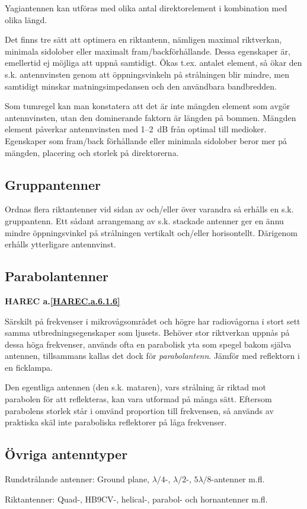 Yagiantennen kan utföras med olika antal direktorelement i kombination med
olika längd.

Det finns tre sätt att optimera en riktantenn, nämligen maximal
riktverkan, minimala sidolober eller maximalt fram/backförhållande.
Dessa egenskaper är, emellertid ej möjliga att uppnå samtidigt.
Ökas t.ex. antalet element, så ökar den s.k. antennvinsten genom att
öppningsvinkeln på strålningen blir mindre, men samtidigt minskar
matningsimpedansen och den användbara bandbredden.

Som tumregel kan man konstatera att det är inte mängden element som
avgör antennvinsten, utan den dominerande faktorn är längden på bommen.
Mängden element påverkar antennvinsten med 1--2~dB från optimal till
medioker.
Egenskaper som fram/back förhållande eller minimala sidolober beror mer
på mängden, placering och storlek på direktorerna.

\subsection{Gruppantenner}

Ordnas flera riktantenner vid sidan av och/eller över varandra så
erhålls en s.k. gruppantenn.
Ett sådant arrangemang av s.k. stackade antenner ger en ännu mindre
öppningsvinkel på strålningen vertikalt och/eller horisontellt.
Därigenom erhålls ytterligare antennvinst.

\subsection{Parabolantenner}
\textbf{
HAREC a.\ref{HAREC.a.6.1.6}\label{myHAREC.a.6.1.6}
}

Särskilt på frekvenser i mikrovågsområdet och högre har radiovågorna i
stort sett samma utbredningsegenskaper som ljusets.
Behöver stor riktverkan uppnås på dessa höga frekvenser, används ofta en
parabolisk yta som spegel bakom själva antennen, tillsammans kallas det dock
för \emph{parabolantenn}.
Jämför med reflektorn i en ficklampa.

Den egentliga antennen (den s.k. mataren), vars strålning är riktad
mot parabolen för att reflekteras, kan vara utformad på många sätt.
Eftersom parabolens storlek står i omvänd proportion till frekvensen, så
används av praktiska skäl inte paraboliska reflektorer på låga frekvenser.

\subsection{Övriga antenntyper}

Rundstrålande antenner: Ground plane, \(\lambda/4\)-, \(\lambda/2\)-,
\(5\lambda/8\)-antenner m.fl.

Riktantenner: Quad-, HB9CV-, helical-, parabol- och hornantenner m.fl.
